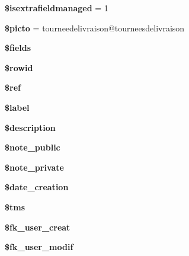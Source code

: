 \begin{DoxyCompactItemize}
{\bfseries \$isextrafieldmanaged} = 1
\item 
\mbox{\label{classTourneeDeLivraison_ad7495725cda8863ae9115035d7f8019f}} 
{\bfseries \$picto} = \textquotesingle{}tourneedelivraison@tourneesdelivraison\textquotesingle{}
\item 
{\bfseries \$fields}
\item 
\mbox{\label{classTourneeDeLivraison_a6e0d92fb3cc1041f3a8d3cdfed607c56}} 
{\bfseries \$rowid}
\item 
\mbox{\label{classTourneeDeLivraison_a8646a31d9e0f6efe3494b3120a28b35e}} 
{\bfseries \$ref}
\item 
\mbox{\label{classTourneeDeLivraison_a6e9dbec70c7289970ab569a9b39230c2}} 
{\bfseries \$label}
\item 
\mbox{\label{classTourneeDeLivraison_ad760b4cb154a81e62dab335e9ec4f65e}} 
{\bfseries \$description}
\item 
\mbox{\label{classTourneeDeLivraison_a2ee492b1f4211e4159925c8214ba8bde}} 
{\bfseries \$note\+\_\+public}
\item 
\mbox{\label{classTourneeDeLivraison_af10254ac5fef9b2b2d305c353c39961d}} 
{\bfseries \$note\+\_\+private}
\item 
\mbox{\label{classTourneeDeLivraison_aefd484e09c25f782574fb489200194a8}} 
{\bfseries \$date\+\_\+creation}
\item 
\mbox{\label{classTourneeDeLivraison_a2d1404f924de635e6dc2f5da940bf485}} 
{\bfseries \$tms}
\item 
\mbox{\label{classTourneeDeLivraison_a87b6f22da095951435f66d0224a93da5}} 
{\bfseries \$fk\+\_\+user\+\_\+creat}
\item 
\mbox{\label{classTourneeDeLivraison_aa939b6fdd37e036c31d8afe8af206a51}} 
{\bfseries \$fk\+\_\+user\+\_\+modif}
\item 

\end{DoxyCompactItemize}
